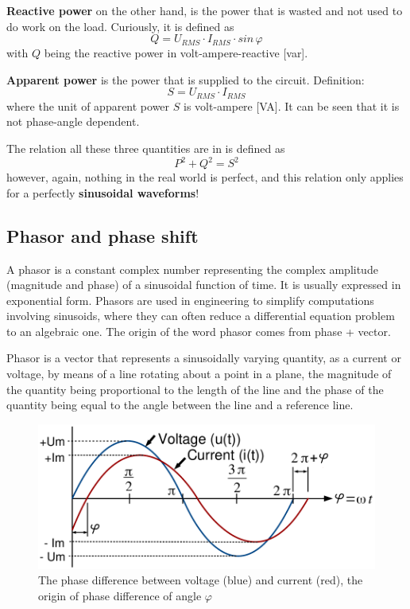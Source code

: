 \documentclass[journal]{IEEEtran}
\begin{document}
\textbf{Reactive power} on the other hand, is the power that is wasted and not used to do work on the load. Curiously, it is defined as 
$$Q = U_{RMS} \cdot I_{RMS} \cdot sin\,\varphi$$
with $Q$ being the reactive power in volt-ampere-reactive [var].

\textbf{Apparent power} is the power that is supplied to the circuit. Definition:
$$S = U_{RMS} \cdot I_{RMS}$$
where the unit of apparent power $S$ is volt-ampere [VA]. It can be seen that it is not phase-angle dependent.

The relation all these three quantities are in is defined as 
$$ P^2 + Q^2 = S^2 $$
however, again, nothing in the real world is perfect, and this relation only applies for a perfectly \textbf{sinusoidal waveforms}!


\subsection{Phasor and phase shift}
A phasor\cite{2009electrical} is a constant complex number representing the complex amplitude (magnitude and phase) of a sinusoidal function of time. It is usually expressed in exponential form. Phasors are used in engineering to simplify computations involving sinusoids, where they can often reduce a differential equation problem to an algebraic one. The origin of the word phasor comes from phase + vector.

Phasor is a vector that represents a sinusoidally varying quantity, as a current or voltage, by means of a line rotating about a point in a plane, the magnitude of the quantity being proportional to the length of the line and the phase of the quantity being equal to the angle between the line and a reference line.

\begin{figure}[ht!]
\centering
\includegraphics[width=1\linewidth,angle=0]{phase_diff}
\caption{The phase difference between voltage (blue) and current (red), the origin of phase difference of angle $\varphi$}\label{f:ph_diff}
\end{figure}
\end{document}
